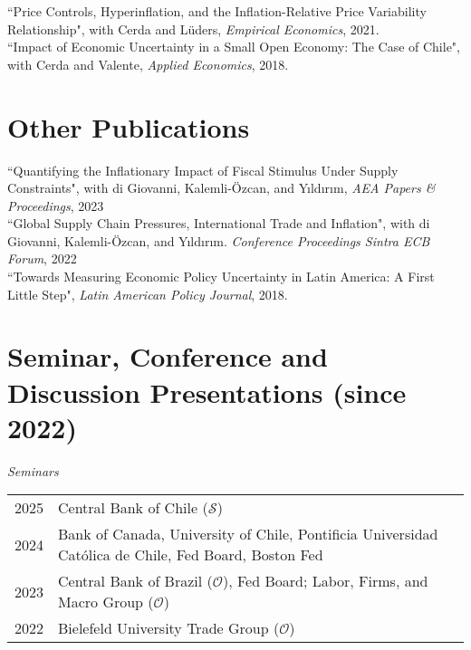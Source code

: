 \documentclass[10pt]{article}
\begin{document}
\noindent ``Price Controls, Hyperinflation, and the Inflation-Relative Price Variability Relationship", with Cerda and L\"{u}ders, \emph{Empirical Economics}, 2021.\\[-0.125in]
   
 \noindent ``Impact of Economic Uncertainty in a Small Open Economy: The Case of Chile", with Cerda and Valente, \emph{Applied Economics}, 2018.

\section*{Other Publications}
   
\noindent ``Quantifying the Inflationary Impact of Fiscal Stimulus Under Supply Constraints", with di Giovanni, Kalemli-\"{O}zcan, and Y{\i}ld{\i}r{\i}m, \emph{AEA Papers \& Proceedings}, 2023\\[-0.125in]
   
\noindent ``Global Supply Chain Pressures, International Trade and Inflation", with di Giovanni, Kalemli-\"{O}zcan, and Y{\i}ld{\i}r{\i}m. {\emph{Conference Proceedings Sintra ECB Forum}, 2022}\\[-0.125in]
   
 \noindent ``Towards Measuring Economic Policy Uncertainty in Latin America: A First Little Step", \emph{Latin American Policy Journal}, 2018. \\[-0.125in]


\section*{Seminar, Conference and Discussion Presentations (since 2022)}

\noindent 
\emph{Seminars}\\[0.1in]
\begin{tabular}{@{}p{1.8cm}p{13cm}}
2025 & Central Bank of Chile ($\mathcal{S}$)\\
2024& Bank of Canada, University of Chile, Pontificia Universidad Cat\'olica de Chile, Fed Board, Boston Fed\\
2023& Central Bank of Brazil ($\mathcal{O}$), Fed Board; Labor, Firms, and Macro Group ($\mathcal{O}$)\\
2022& Bielefeld University Trade Group ($\mathcal{O}$)%
\end{tabular}
\end{document}

